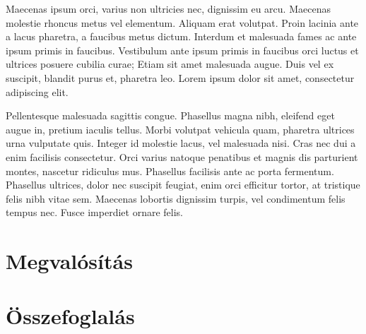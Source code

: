 \documentclass[a4paper,12pt,oneside]{report}
\begin{document}
Maecenas ipsum orci, varius non ultricies nec, dignissim eu arcu. Maecenas
molestie rhoncus metus vel elementum. Aliquam erat volutpat. Proin lacinia ante
a lacus pharetra, a faucibus metus dictum. Interdum et malesuada fames ac ante
ipsum primis in faucibus. Vestibulum ante ipsum primis in faucibus orci luctus
et ultrices posuere cubilia curae; Etiam sit amet malesuada augue. Duis vel ex
suscipit, blandit purus et, pharetra leo. Lorem ipsum dolor sit amet,
consectetur adipiscing elit.

Pellentesque malesuada sagittis congue. Phasellus magna nibh, eleifend eget
augue in, pretium iaculis tellus. Morbi volutpat vehicula quam, pharetra
ultrices urna vulputate quis. Integer id molestie lacus, vel malesuada nisi.
Cras nec dui a enim facilisis consectetur. Orci varius natoque penatibus et
magnis dis parturient montes, nascetur ridiculus mus. Phasellus facilisis ante
ac porta fermentum. Phasellus ultrices, dolor nec suscipit feugiat, enim orci
efficitur tortor, at tristique felis nibh vitae sem. Maecenas lobortis
dignissim turpis, vel condimentum felis tempus nec. Fusce imperdiet ornare
felis.

\chapter{Megvalósítás}


\chapter{Összefoglalás}
\end{document}
